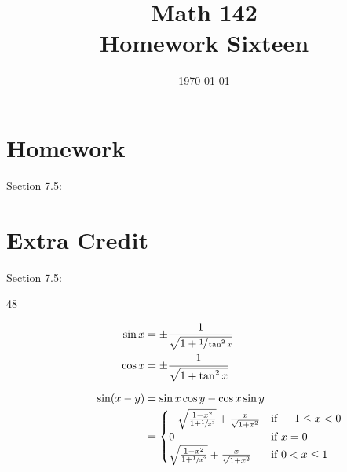 \documentclass{exam}
\author{}
\date{\today}
\title{Math 142 \\ Homework Sixteen}
\begin{document}
  \maketitle

  \section{Homework}
  Section 7.5:

  \section{Extra Credit}
  Section 7.5: 

  \ifprintanswers
    \begin{description}
      \item[48]
        \begin{align*}
          \sin x &= \pm \frac{1}{\sqrt{1 + \sfrac{1}{\tan^2 x}}} \\
          \cos x &= \pm \frac{1}{\sqrt{1 + \tan^2 x}} \\
          \\
          \sin(x - y) &= \sin x \cos y - \cos x \sin y \\
                      &= \begin{cases}
                            - \sqrt{ \frac{1 - x^2}{1 + \sfrac{1}{x^2}}} + \frac{x}{\sqrt{1 + x^2}} & \mbox{if } -1 \leq x < 0 \\
                            0                                                                       & \mbox{if } x = 0 \\
                            \sqrt{ \frac{1 - x^2}{1 + \sfrac{1}{x^2}}} + \frac{x}{\sqrt{1 + x^2}}   & \mbox{if } 0 < x \leq 1 \\
                          \end{cases}
        \end{align*}

    \end{description}
  \fi

  \ifprintanswers
\end{document}
